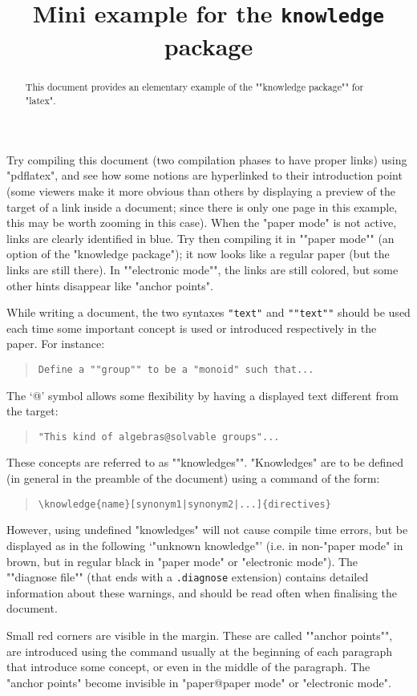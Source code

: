 \documentclass{article}
\title{Mini example for the \texttt{knowledge} package}
\date{}
\begin{document}
\maketitle
\begin{abstract}
\AP This document provides an elementary example of the ""knowledge package"" for "latex".
\end{abstract}

Try compiling this document (two compilation phases to have proper links) using "pdflatex", and see how some notions are hyperlinked to their introduction point (some viewers make it more obvious than others by displaying a preview of the target of a link inside a document; since there is only one page in this example, this may be worth zooming in this case).
\AP When the "paper mode" is not active, links are clearly identified in blue. Try then compiling it in ""paper mode"" (an option of the "knowledge package"); it now looks like a regular paper (but the links are still there). In ""electronic mode"",
the links are still colored, but some other hints disappear like "anchor points".



\AP While writing a document, the two syntaxes \verb|"text"| and \verb|""text""| should be used each time some important concept is used or introduced respectively in the paper. For instance:
\begin{quote}
\verb|Define a ""group"" to be a "monoid" such that...|
\end{quote}
The `@' symbol allows some flexibility by having a displayed text different from the target:
\begin{quote}
\verb|"This kind of algebras@solvable groups"...|
\end{quote}

\AP These concepts are referred to as ""knowledges"". "Knowledges" are to be defined (in general in the preamble of the document) using a command of the form:
\begin{quote}
\verb|\knowledge|\texttt{\{name\}[synonym1|synonym2|...]\{directives\}}
\end{quote}
However, using undefined "knowledges" will not cause compile time errors, but be displayed as in the following `"unknown knowledge"' (i.e. in non-"paper mode" in brown, but in regular black in "paper mode" or "electronic mode"). \AP The ""diagnose file"" (that ends with a \texttt{.diagnose} extension) contains detailed information about these warnings, and should be read often when finalising the document.

\AP Small red corners are visible in the margin. These are called ""anchor points"", are introduced
using the \texttt{\detokenize{\AP}}command usually at the beginning of each paragraph that introduce some concept, or even in the middle of the paragraph. The "anchor points" become invisible in "paper@paper mode" or "electronic mode".
\end{document}
